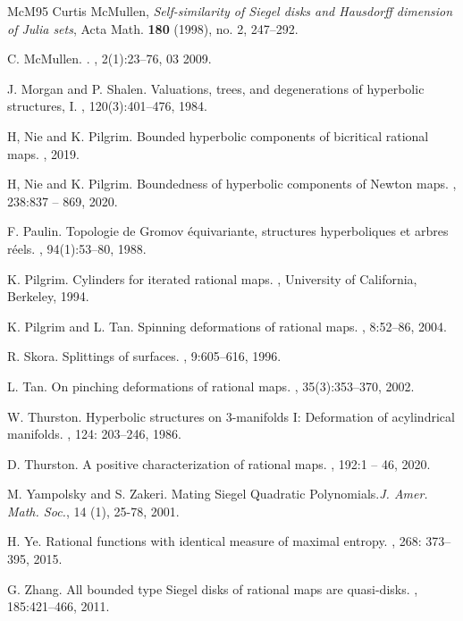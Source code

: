 \documentclass[11pt, reqno]{amsart}
\numberwithin{equation}{section}
\theoremstyle{plain}
\theoremstyle{theorem}
\theoremstyle{plain}
\theoremstyle{definition}
\numberwithin{figure}{section}
\begin{document}
\begin{thebibliography}{McM95}
Curtis McMullen, \emph{Self-similarity of Siegel disks and Hausdorff dimension of Julia sets}, Acta Math. \textbf{180} (1998), no. 2, 247--292.
  
C. McMullen.
.
, 2(1):23--76, 03 2009.
  
J. Morgan and P. Shalen.
\newblock Valuations, trees, and degenerations of hyperbolic structures, {I}.
, 120(3):401--476, 1984.
  
H, Nie and K. Pilgrim.
\newblock Bounded hyperbolic components of bicritical rational maps.
, 2019.

H, Nie and K. Pilgrim.
\newblock Boundedness of hyperbolic components of Newton maps.
, 238:837 -- 869, 2020.

F. Paulin.
\newblock Topologie de {Gromov} {\'e}quivariante, structures hyperboliques et
  arbres r{\'e}els.
, 94(1):53--80, 1988.

K. Pilgrim.
\newblock Cylinders for iterated rational maps.
, University of California, Berkeley, 1994.

K. Pilgrim and L. Tan.
\newblock Spinning deformations of rational maps.
, 8:52--86, 2004.

R. Skora.
\newblock Splittings of surfaces.
, 9:605--616, 1996.

L. Tan.
\newblock On pinching deformations of rational maps.
, 35(3):353--370, 2002.

W.  Thurston.
\newblock Hyperbolic structures on 3-manifolds I: Deformation of acylindrical manifolds.
, 124: 203--246, 1986.

D. Thurston.
\newblock A positive characterization of rational maps.
, 192:1 -- 46, 2020.

 M. Yampolsky and S. Zakeri. Mating Siegel Quadratic Polynomials.{\em J. Amer. Math. Soc.}, 14 (1), 25-78, 2001.

H. Ye.
\newblock Rational functions with identical measure of maximal entropy.
, 268: 373--395, 2015.

G. Zhang.
\newblock All bounded type Siegel disks of rational maps are quasi-disks.
, 185:421--466, 2011.


\end{thebibliography}
\end{document}
